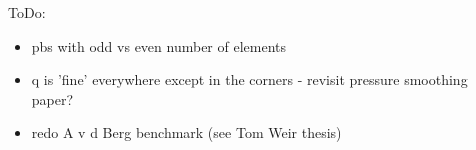 
ToDo:
\begin{itemize}
\item pbs with odd vs even number of elements 
\item q is 'fine' everywhere except in the corners - revisit pressure smoothing paper?
\item redo A v d Berg benchmark (see Tom Weir thesis)
\end{itemize}


